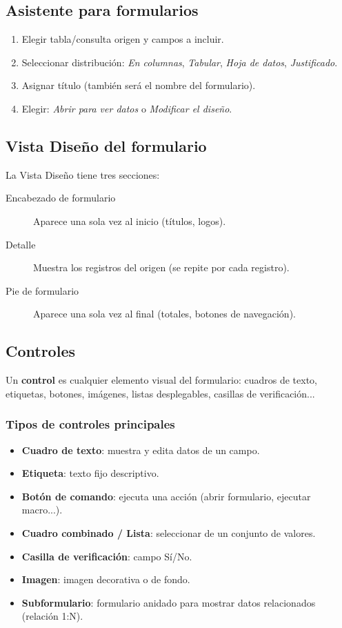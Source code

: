 \documentclass[12pt,a4paper]{article}
\begin{document}
\subsection{Asistente para formularios}

\begin{enumerate}
  \item Elegir tabla/consulta origen y campos a incluir.
  \item Seleccionar distribución: \emph{En columnas}, \emph{Tabular}, \emph{Hoja de datos}, \emph{Justificado}.
  \item Asignar título (también será el nombre del formulario).
  \item Elegir: \emph{Abrir para ver datos} o \emph{Modificar el diseño}.
\end{enumerate}

\subsection{Vista Diseño del formulario}

La Vista Diseño tiene tres secciones:

\begin{description}
  \item[Encabezado de formulario] Aparece una sola vez al inicio (títulos, logos).
  \item[Detalle] Muestra los registros del origen (se repite por cada registro).
  \item[Pie de formulario] Aparece una sola vez al final (totales, botones de navegación).
\end{description}

\subsection{Controles}

Un \textbf{control} es cualquier elemento visual del formulario: cuadros de texto, etiquetas, botones, imágenes, listas desplegables, casillas de verificación...

\subsubsection{Tipos de controles principales}

\begin{itemize}
  \item \textbf{Cuadro de texto}: muestra y edita datos de un campo.
  \item \textbf{Etiqueta}: texto fijo descriptivo.
  \item \textbf{Botón de comando}: ejecuta una acción (abrir formulario, ejecutar macro...).
  \item \textbf{Cuadro combinado / Lista}: seleccionar de un conjunto de valores.
  \item \textbf{Casilla de verificación}: campo Sí/No.
  \item \textbf{Imagen}: imagen decorativa o de fondo.
  \item \textbf{Subformulario}: formulario anidado para mostrar datos relacionados (relación 1:N).
\end{itemize}
\end{document}
